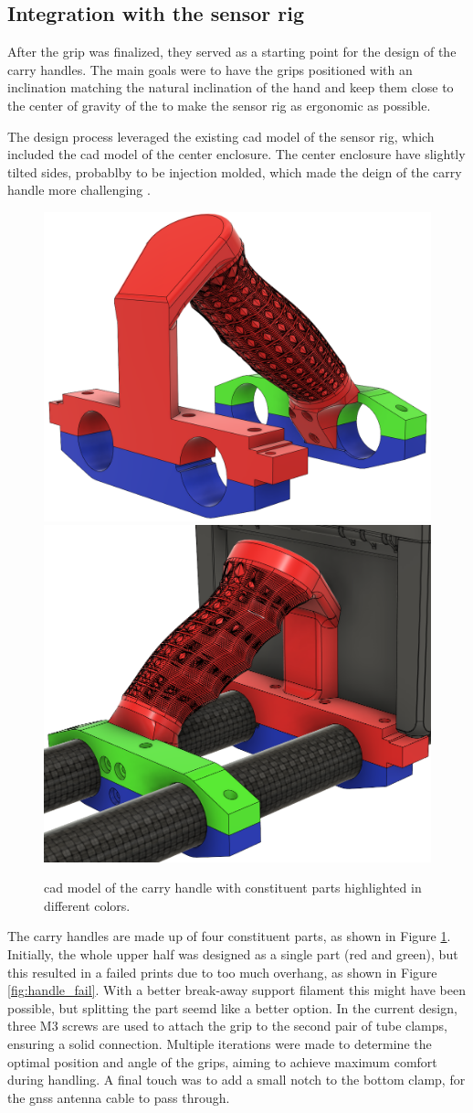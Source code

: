 \subsection{Integration with the sensor rig}
After the grip was finalized, they served as a starting point for the design of the carry handles.
The main goals were to have the grips positioned with an inclination matching the natural inclination of the hand and keep them close to the center of gravity of the \sr to make the sensor rig as ergonomic as possible.

The design process leveraged the existing cad model of the sensor rig, which included the cad model of the center enclosure.
The center enclosure have slightly tilted sides, probablby to be injection molded, which made the deign of the carry handle more challenging \cite{booplaEnclosure}.

\begin{figure}[H]
    \centering
    \includegraphics[width=.48\textwidth]{figures/3d_print/handle_cad.png}
    \includegraphics[width=.48\textwidth]{figures/3d_print/handle_cad_2.png}
    \caption{\gls{cad} model of the carry handle with constituent parts highlighted in different colors.}
    \label{fig:constituent_parts}
\end{figure}

The carry handles are made up of four constituent parts, as shown in Figure \ref{fig:constituent_parts}.
Initially, the whole upper half was designed as a single part (red and green), but this resulted in a failed prints due to too much overhang, as shown in Figure \ref{fig:handle_fail}.
With a better break-away support filament this might have been possible, but splitting the part seemd like a better option.
In the current design, three M3 screws are used to attach the grip to the second pair of tube clamps, ensuring a solid connection.
Multiple iterations were made to determine the optimal position and angle of the grips, aiming to achieve maximum comfort during handling.
A final touch was to add a small notch to the bottom clamp, for the \gls{gnss} antenna cable to pass through.

